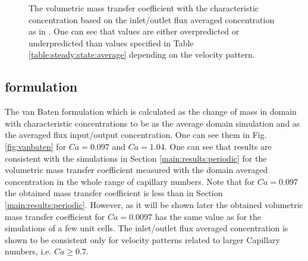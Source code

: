 \documentclass{article}
\begin{document}
\begin{figure}[htb!]
\caption{The volumetric mass transfer coefficient
with the characteristic concentration based on
the inlet/outlet flux averaged concentration as
in \cite{vanbaten-circular}. One can see that values are either overpredicted or underpredicted
than values specified in Table \ref{table:steady:state:average} depending on the velocity pattern. 
\label{fig:volumetric:char:concentration:vanbaten}}
\end{figure}


\subsection{\citeauthor{vanbaten-circular} formulation}
\label{results:vanbaten}
The van Baten formulation which is calculated as the change of mass in domain with characteristic
concentrations to be as the average domain simulation and as the averaged flux input/output
concentration. One can see them in Fig. \ref{fig:vanbaten} for $Ca=0.097$ and
$Ca=1.04$. One can see that results are consistent with the simulations in Section
\ref{main:results:periodic} for the volumetric mass transfer coefficient measured with the domain
averaged concentration in the whole range of capillary numbers. Note that for $Ca=0.097$ the
obtained mass transfer coefficient is less than in Section \ref{main:results:periodic}. However, as
it will be shown later the obtained volumetric mass transfer coefficient for $Ca=0.0097$ has the
same value as for the simulations of a few unit cells. The
inlet/outlet
flux averaged concentration is shown to be consistent only for velocity patterns related to larger
Capillary numbers, i.e. $Ca\geq0.7$. 
\end{document}
